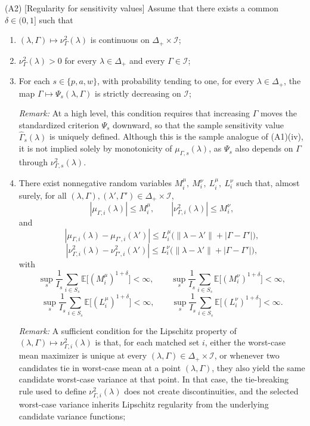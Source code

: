 \documentclass[12pt,leqno,titlepage]{amsart}
\newcommand{\1}{\mathbbm{1}}
\begin{document}
\begin{bibunit}
{\noindent\textup{(A2)} {[Regularity for sensitivity values]}
Assume that there exists a common \(\delta\in(0,1]\) such that
\begin{enumerate}[label=(\roman*)]
\item \((\lambda,\Gamma)\mapsto \nu_\Gamma^2(\lambda)\) is continuous on \(\Delta_+\times\mathcal I\);
\item \(\nu_\Gamma^2(\lambda)>0\) for every \(\lambda\in\Delta_+\) and every \(\Gamma\in\mathcal I\);
\item For each \(s\in\{p,a,w\}\), with probability tending to one, for every \(\lambda\in\Delta_+\), the map
$
\Gamma\mapsto \Psi_s(\lambda,\Gamma)
$
is strictly decreasing on \(\mathcal I\);

\textit{Remark:} At a high level, this condition requires that increasing $\Gamma$ moves the standardized criterion $\Psi_s$ downward, so that the sample sensitivity value $\widehat\Gamma_s(\lambda)$ is uniquely defined. Although this is the sample analogue of \textup{(A1)(iv)}, it is not implied solely by monotonicity of $\mu_{\Gamma,s}(\lambda)$, as $\Psi_s$ also depends on $\Gamma$ through $\nu_{\Gamma,s}^2(\lambda)$.

\item There exist nonnegative random variables
$
M_i^\mu,\ M_i^\nu,\ L_i^\mu,\ L_i^\nu
$
such that, almost surely, for all \((\lambda,\Gamma),(\lambda',\Gamma')\in\Delta_+\times\mathcal I\),
\[
|\mu_{\Gamma,i}(\lambda)|\le M_i^\mu,
\qquad
|\nu_{\Gamma,i}^2(\lambda)|\le M_i^\nu,
\]
and
\[
|\mu_{\Gamma,i}(\lambda)-\mu_{\Gamma',i}(\lambda')|
\le
L_i^\mu\bigl(\|\lambda-\lambda'\|+|\Gamma-\Gamma'|\bigr),
\]
\[
|\nu_{\Gamma,i}^2(\lambda)-\nu_{\Gamma',i}^2(\lambda')|
\le
L_i^\nu\bigl(\|\lambda-\lambda'\|+|\Gamma-\Gamma'|\bigr),
\]
with
\[
\sup_s \frac1{I_s}\sum_{i\in S_s}\mathbb E\bigl[(M_i^\mu)^{1+\delta}\bigr]<\infty,
\qquad
\sup_s \frac1{I_s}\sum_{i\in S_s}\mathbb E\bigl[(M_i^\nu)^{1+\delta}\bigr]<\infty,
\]
\[
\sup_s \frac1{I_s}\sum_{i\in S_s}\mathbb E\bigl[(L_i^\mu)^{1+\delta}\bigr]<\infty,
\qquad
\sup_s \frac1{I_s}\sum_{i\in S_s}\mathbb E\bigl[(L_i^\nu)^{1+\delta}\bigr]<\infty.
\]

\textit{Remark:} A sufficient condition for the Lipschitz property of \((\lambda,\Gamma)\mapsto \nu_{\Gamma,i}^2(\lambda)\) is that, for each matched set \(i\), either the worst-case mean maximizer is unique at every \((\lambda,\Gamma)\in\Delta_+\times\mathcal I\), or whenever two candidates tie in worst-case mean at a point \((\lambda,\Gamma)\), they also yield the same candidate worst-case variance at that point. In that case, the tie-breaking rule used to define \(\nu_{\Gamma,i}^2(\lambda)\) does not create discontinuities, and the selected worst-case variance inherits Lipschitz regularity from the underlying candidate variance functions;


\end{enumerate}}
\end{bibunit}
\end{document}
